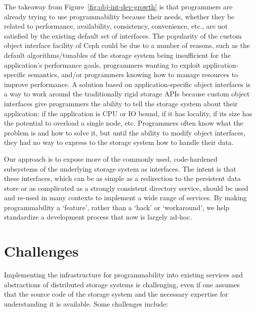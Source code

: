 \documentclass[preprint]{sigplanconf-eurosys}
\begin{document}
The takeaway from Figure~\ref{fig:obj-int-dev-growth} is that programmers are
already trying to use programmability because their needs, whether they be
related to performance, availability, consistency, convenience, etc., are not
satisfied by the existing default set of interfaces. The popularity of the
custom object interface facility of Ceph could be due to a number of reasons,
such as the default algorithms/tunables of the storage system being
insufficient for the application's performance goals, programmers wanting to
exploit application-specific semantics, and/or programmers knowing how to
manage resources to improve performance. A solution based on
application-specific object interfaces is a way to work around the
traditionally rigid storage APIs because custom object interfaces give
programmers the ability to tell the storage system about their application: if
the application is CPU or IO bound, if it has locality, if its size has the potential to
overload a single node, etc.  Programmers often know what the problem is
and how to solve it, but until the ability to modify object interfaces, they
had no way to express to the storage system how to handle their data.

Our approach is to expose more of the commonly used, code-hardened subsystems
of the underlying storage system as interfaces. The intent is that these
interfaces, which can be as simple as a redirection to the persistent data
store or as complicated as a strongly consistent directory service, should be
used and re-used in many contexts to implement a wide range of services. By
making programmability a `feature', rather than a `hack' or `workaround', we
help standardize a development process that now is largely ad-hoc.

\section{Challenges}
\label{sec:challenges}

Implementing the infrastructure for programmability into existing services and
abstractions of distributed storage systems is challenging, even if one assumes
that the source code of the storage system and the necessary expertise for
understanding it is available.  Some challenges include:
\end{document}
